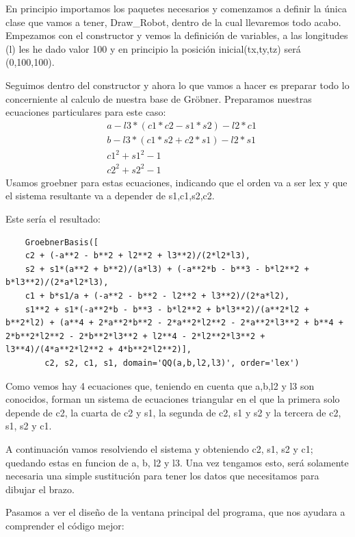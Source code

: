 En principio importamos los paquetes necesarios y comenzamos a definir la única clase que vamos a tener, Draw\_Robot, dentro de la cual llevaremos todo acabo.
Empezamos con el constructor y vemos la definición de variables, a las longitudes (l) les he dado valor 100 y en principio la posición inicial(tx,ty,tz) será (0,100,100).

Seguimos dentro del constructor y ahora lo que vamos a hacer es preparar todo lo concerniente al calculo de nuestra base de Gröbner. Preparamos nuestras ecuaciones particulares para este caso:
\begin{eqnarray}
\nonumber &a-l3*(c1*c2-s1*s2)-l2*c1 \\
\nonumber &b-l3*(c1*s2+c2*s1)-l2*s1 \\
\nonumber &c1^2+s1^2-1 \\
\nonumber &c2^2+s2^2-1
\end{eqnarray}
Usamos groebner para estas ecuaciones, indicando que el orden va a ser lex y que el sistema resultante va a depender de s1,c1,s2,c2. 

Este sería el resultado:

\begin{lstlisting}
	GroebnerBasis([
	c2 + (-a**2 - b**2 + l2**2 + l3**2)/(2*l2*l3), 
	s2 + s1*(a**2 + b**2)/(a*l3) + (-a**2*b - b**3 - b*l2**2 + b*l3**2)/(2*a*l2*l3), 
	c1 + b*s1/a + (-a**2 - b**2 - l2**2 + l3**2)/(2*a*l2), 
	s1**2 + s1*(-a**2*b - b**3 - b*l2**2 + b*l3**2)/(a**2*l2 + b**2*l2) + (a**4 + 2*a**2*b**2 - 2*a**2*l2**2 - 2*a**2*l3**2 + b**4 + 2*b**2*l2**2 - 2*b**2*l3**2 + l2**4 - 2*l2**2*l3**2 + l3**4)/(4*a**2*l2**2 + 4*b**2*l2**2)], 
		c2, s2, c1, s1, domain='QQ(a,b,l2,l3)', order='lex')
\end{lstlisting}

Como vemos hay 4 ecuaciones que, teniendo en cuenta que a,b,l2 y l3 son conocidos, forman un sistema de ecuaciones triangular en el que la primera solo depende de c2, la cuarta de c2 y s1, la segunda de c2, s1 y s2 y la tercera de c2, s1, s2 y c1.

A continuación vamos resolviendo el sistema y obteniendo c2, s1, s2 y c1; quedando estas en funcion de a, b, l2 y l3. Una vez tengamos esto, será solamente necesaria una simple sustitución para tener los datos que necesitamos para dibujar el brazo.



Pasamos a ver el diseño de la ventana principal del programa, que nos ayudara a comprender el código mejor:

